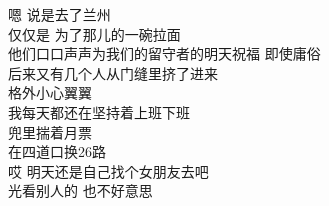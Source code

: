 \begin{songs}{}
	嗯 \hspace{5mm} 说是去了兰州	\\
	仅仅是 \hspace{5mm} 为了那儿的一碗拉面	\\
	他们口口声声为我们的留守者的明天祝福 \hspace{5mm} 即使庸俗	\\
	后来又有几个人从门缝里挤了进来	\\
	格外小心翼翼	\\
	我每天都还在坚持着上班下班	\\
	兜里揣着月票	\\
	在四道口换26路	\\
	哎 \hspace{5mm} 明天还是自己找个女朋友去吧	\\
	光看别人的	\hspace{5mm} 也不好意思	\\
  \endsong
\end{songs}
